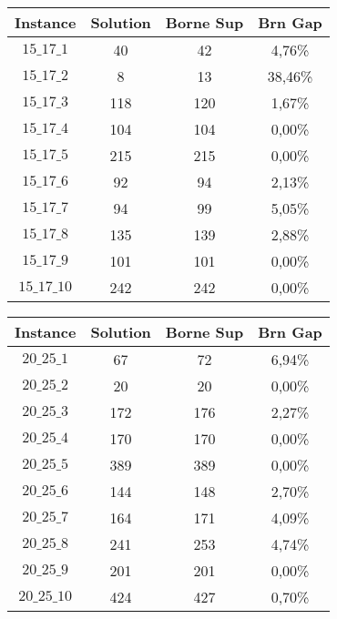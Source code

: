 \documentclass[a4paper, 11pt]{article} %
\begin{document}
\begin{center}
\begin{figure}[H]
   \begin{minipage}[c]{.46\linewidth}
      \begin{tabular}{|c|c|c|c|}
      \hline 
        Instance & Solution & Borne Sup & Brn Gap  \\ \hline
$15\_17\_1$ & 40 &  42 &  4,76\% \\ \hline
$15\_17\_2$ & 8 & 13 &  38,46\% \\ \hline
$15\_17\_3$ & 118 & 120 & 1,67\% \\ \hline
$15\_17\_4$ & 104 & 104 & 0,00\% \\ \hline
$15\_17\_5$ & 215 & 215 & 0,00\% \\ \hline
$15\_17\_6$ & 92 &  94 &  2,13\% \\ \hline
$15\_17\_7$ & 94 &  99 &  5,05\% \\ \hline
$15\_17\_8$ & 135 & 139 & 2,88\% \\ \hline
$15\_17\_9$ & 101 & 101 & 0,00\% \\ \hline
$15\_17\_10$ & 242 & 242 & 0,00\% \\ \hline
      \end{tabular}
   \end{minipage} \hfill
   \begin{minipage}[c]{.46\linewidth}
      \begin{tabular}{|c|c|c|c|}
      \hline 
        Instance & Solution & Borne Sup & Brn Gap  \\ \hline
$20\_25\_1$ & 67 &  72 &  6,94\% \\ \hline
$20\_25\_2$ & 20 &  20 &  0,00\% \\ \hline
$20\_25\_3$ & 172 & 176 & 2,27\% \\ \hline
$20\_25\_4$ & 170 & 170 & 0,00\% \\ \hline
$20\_25\_5$ & 389 & 389 & 0,00\% \\ \hline
$20\_25\_6$ & 144 & 148 & 2,70\% \\ \hline
$20\_25\_7$ & 164 & 171 & 4,09\% \\ \hline
$20\_25\_8$ & 241 & 253 & 4,74\% \\ \hline
$20\_25\_9$ & 201 & 201 & 0,00\% \\ \hline
$20\_25\_10$ & 424 & 427 & 0,70\% \\ \hline
      \end{tabular}
   \end{minipage}
\end{figure}


\end{center}
\end{document}
